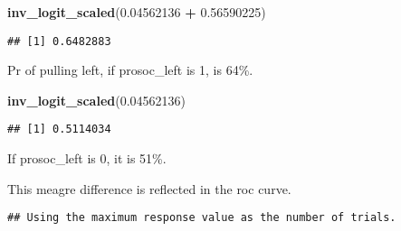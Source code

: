 \documentclass[]{article}
\newenvironment{Shaded}{\begin{snugshade}}{\end{snugshade}}
\newcommand{\KeywordTok}[1]{\textcolor[rgb]{0.13,0.29,0.53}{\textbf{#1}}}
\newcommand{\DataTypeTok}[1]{\textcolor[rgb]{0.13,0.29,0.53}{#1}}
\newcommand{\DecValTok}[1]{\textcolor[rgb]{0.00,0.00,0.81}{#1}}
\newcommand{\FloatTok}[1]{\textcolor[rgb]{0.00,0.00,0.81}{#1}}
\newcommand{\StringTok}[1]{\textcolor[rgb]{0.31,0.60,0.02}{#1}}
\newcommand{\OperatorTok}[1]{\textcolor[rgb]{0.81,0.36,0.00}{\textbf{#1}}}
\newcommand{\NormalTok}[1]{#1}
\begin{document}
\begin{Shaded}
\begin{Highlighting}[]
\KeywordTok{inv_logit_scaled}\NormalTok{(}\FloatTok{0.04562136} \OperatorTok{+}\StringTok{ }\FloatTok{0.56590225}\NormalTok{)}
\end{Highlighting}
\end{Shaded}

\begin{verbatim}
## [1] 0.6482883
\end{verbatim}

Pr of pulling left, if prosoc\_left is 1, is 64\%.

\begin{Shaded}
\begin{Highlighting}[]
\KeywordTok{inv_logit_scaled}\NormalTok{(}\FloatTok{0.04562136}\NormalTok{)}
\end{Highlighting}
\end{Shaded}

\begin{verbatim}
## [1] 0.5114034
\end{verbatim}

If prosoc\_left is 0, it is 51\%.

This meagre difference is reflected in the roc curve.

\begin{Shaded}
\end{Shaded}

\begin{verbatim}
## Using the maximum response value as the number of trials.
\end{verbatim}

\begin{Shaded}
\end{Shaded}
\end{document}

